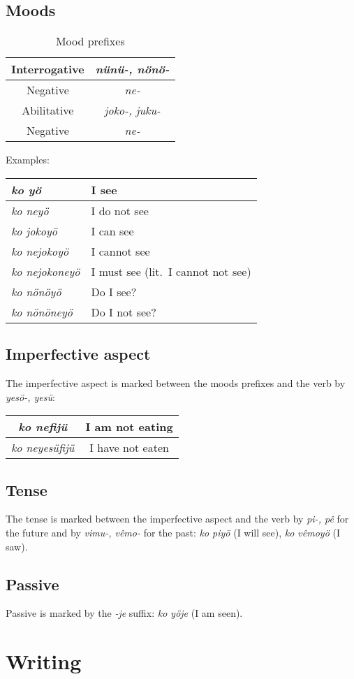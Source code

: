 \documentclass[a4paper]{article}
\begin{document}
\subsection{Moods}

\begin{table}[H]
\begin{tabular}{c | c}
Interrogative & \emph{n\"un\"u-, n\"on\"o-} \\
\hline
Negative & \emph{ne-} \\
\hline
Abilitative & \emph{joko-, juku-} \\
\hline
Negative & \emph{ne-}
\end{tabular}
\caption{Mood prefixes}
\end{table}

Examples:
\begin{table}[H]
\begin{tabular}{l | l}
\emph{ko y\"o} & I see \\
\hline
\emph{ko ney\"o} & I do not see \\
\hline
\emph{ko jokoy\"o} & I can see \\
\hline
\emph{ko nejokoy\"o} & I cannot see \\
\hline
\emph{ko nejokoney\"o} & I must see (lit.\ I cannot not see) \\
\hline
\emph{ko n\"on\"oy\"o} & Do I see? \\
\hline
\emph{ko n\"on\"oney\"o} & Do I not see?
\end{tabular}
\end{table}

\subsection{Imperfective aspect}

The imperfective aspect is marked between the moods prefixes and the verb by
\emph{yes\"o-, yes\"u}: 
\begin{tabular}{c | c}
\emph{ko nefij\"u} & I am not eating \\
\hline
\emph{ko neyes\"ufij\"u} & I have not eaten
\end{tabular} 

\subsection{Tense}

The tense is marked between the imperfective aspect and the verb by
\emph{pi-, p\^e} for the future and by \emph{vimu-, v\^emo-} for the past:
\emph{ko piy\"o} (I will see), \emph{ko v\^emoy\"o} (I saw).

\subsection{Passive}

Passive is marked by the \emph{-je} suffix: \emph{ko y\"oje} (I am seen).

\section{Writing}
\end{document}
